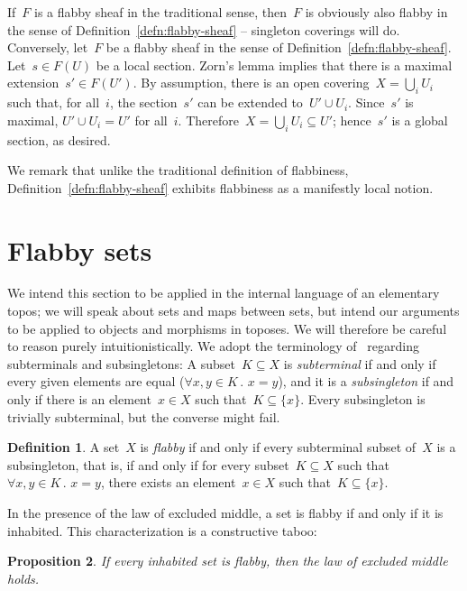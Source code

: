 \documentclass[oneside]{amsart}
\theoremstyle{definition}
\newtheorem{defn}{Definition}[section]
\theoremstyle{plain}
\newtheorem{prop}[defn]{Proposition}
\theoremstyle{remark}
\renewcommand{\_}{\mathpunct{.}\,}
\begin{document}
If~$F$ is a flabby sheaf in the traditional sense, then~$F$ is obviously also
flabby in the sense of Definition~\ref{defn:flabby-sheaf} -- singleton
coverings will do. Conversely, let~$F$ be a flabby sheaf in the sense of
Definition~\ref{defn:flabby-sheaf}. Let~$s \in F(U)$ be a local section. Zorn's
lemma implies that there is a maximal extension~$s' \in F(U')$. By assumption,
there is an open covering~$X = \bigcup_i U_i$ such that, for all~$i$, the
section~$s'$ can be extended to~$U' \cup U_i$. Since~$s'$ is maximal, $U' \cup
U_i = U'$ for all~$i$. Therefore~$X = \bigcup_i U_i \subseteq U'$; hence~$s'$ is a
global section, as desired.

We remark that unlike the traditional definition of flabbiness,
Definition~\ref{defn:flabby-sheaf} exhibits flabbiness as a manifestly local
notion.


\section{Flabby sets}\label{sect:flabby-sets}

We intend this section to be applied in the internal language of an elementary
topos; we will speak about sets and maps between sets, but intend our arguments
to be applied to objects and morphisms in toposes. We will therefore be careful
to reason purely intuitionistically. We
adopt the terminology of~\cite{kock:partial-maps} regarding subterminals and
subsingletons: A subset~$K \subseteq X$ is \emph{subterminal} if and only if every given
elements are equal ($\forall x,y \in K\_ x = y$), and it is a
\emph{subsingleton} if and only if there is an element~$x \in X$ such that~$K
\subseteq \{ x \}$. Every subsingleton is trivially subterminal, but the converse
might fail.

\begin{defn}A set~$X$ is \emph{flabby} if and only if every subterminal subset
of~$X$ is a subsingleton, that is, if and only if for every subset~$K \subseteq
X$ such that~$\forall x,y \in K\_ x = y$, there exists an element~$x \in X$
such that~$K \subseteq \{ x \}$.
\end{defn}

In the presence of the law of excluded middle, a set is flabby if and only if
it is inhabited. This characterization is a constructive taboo:

\begin{prop}\label{prop:taboo}
If every inhabited set is flabby, then the law of excluded middle
holds.
\end{prop}
\end{document}
